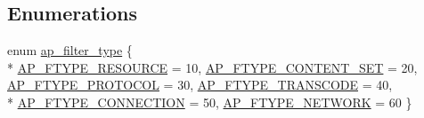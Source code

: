 \subsection*{Enumerations}
\begin{DoxyCompactItemize}
\item 
enum \hyperlink{group__APACHE__CORE__FILTER_ga6dc4721ae075c103a3f3a93775d139fa}{ap\+\_\+filter\+\_\+type} \{ \\*
\hyperlink{group__APACHE__CORE__FILTER_gga6dc4721ae075c103a3f3a93775d139faaac592192246ceec25733c9a957cac878}{A\+P\+\_\+\+F\+T\+Y\+P\+E\+\_\+\+R\+E\+S\+O\+U\+R\+CE} = 10, 
\hyperlink{group__APACHE__CORE__FILTER_gga6dc4721ae075c103a3f3a93775d139faa5dc0affea9b884673dd747fa345e5213}{A\+P\+\_\+\+F\+T\+Y\+P\+E\+\_\+\+C\+O\+N\+T\+E\+N\+T\+\_\+\+S\+ET} = 20, 
\hyperlink{group__APACHE__CORE__FILTER_gga6dc4721ae075c103a3f3a93775d139faaa1ec0f20f33ca0651f3435d8ae970bdd}{A\+P\+\_\+\+F\+T\+Y\+P\+E\+\_\+\+P\+R\+O\+T\+O\+C\+OL} = 30, 
\hyperlink{group__APACHE__CORE__FILTER_gga6dc4721ae075c103a3f3a93775d139faa41e2154d17fc1aa44f7b3b088db8c390}{A\+P\+\_\+\+F\+T\+Y\+P\+E\+\_\+\+T\+R\+A\+N\+S\+C\+O\+DE} = 40, 
\\*
\hyperlink{group__APACHE__CORE__FILTER_gga6dc4721ae075c103a3f3a93775d139faa7ae402ebd5ae1d7453806499e9e06d6a}{A\+P\+\_\+\+F\+T\+Y\+P\+E\+\_\+\+C\+O\+N\+N\+E\+C\+T\+I\+ON} = 50, 
\hyperlink{group__APACHE__CORE__FILTER_gga6dc4721ae075c103a3f3a93775d139faa75f03b263da1cc0421ffbde1fb74a909}{A\+P\+\_\+\+F\+T\+Y\+P\+E\+\_\+\+N\+E\+T\+W\+O\+RK} = 60
 \}
\end{DoxyCompactItemize}
